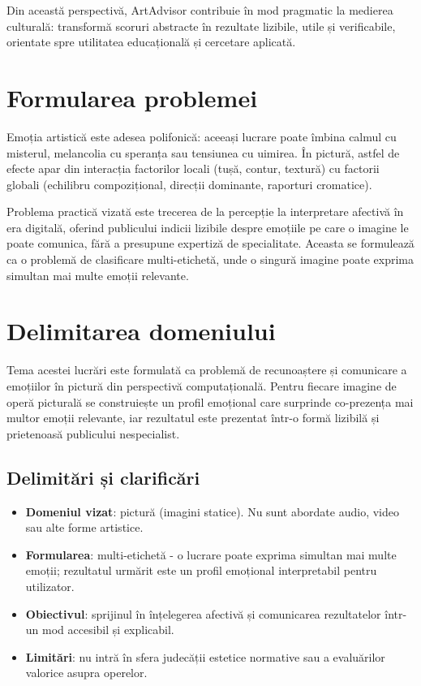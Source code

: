 Din această perspectivă, ArtAdvisor contribuie în mod pragmatic la medierea culturală: transformă scoruri abstracte în rezultate lizibile, utile și verificabile, orientate spre utilitatea educațională și cercetare aplicată.

\section{Formularea problemei}
\label{sec:intro-problema}

Emoția artistică este adesea polifonică: aceeași lucrare poate îmbina calmul cu misterul, melancolia cu speranța sau tensiunea cu uimirea. În pictură, astfel de efecte apar din interacția factorilor locali (tușă, contur, textură) cu factorii globali (echilibru compozițional, direcții dominante, raporturi cromatice).

Problema practică vizată este trecerea de la percepție la interpretare afectivă în era digitală, oferind publicului indicii lizibile despre emoțiile pe care o imagine le poate comunica, fără a presupune expertiză de specialitate. Aceasta se formulează ca o problemă de clasificare multi-etichetă, unde o singură imagine poate exprima simultan mai multe emoții relevante.

\section{Delimitarea domeniului}
\label{sec:intro-domeniu}

Tema acestei lucrări este formulată ca problemă de recunoaștere și comunicare a emoțiilor în pictură din perspectivă computațională. Pentru fiecare imagine de operă picturală se construiește un profil emoțional care surprinde co-prezența mai multor emoții relevante, iar rezultatul este prezentat într-o formă lizibilă și prietenoasă publicului nespecialist.

\subsection{Delimitări și clarificări}

\begin{itemize}
  \item \textbf{Domeniul vizat}: pictură (imagini statice). Nu sunt abordate audio, video sau alte forme artistice.
  \item \textbf{Formularea}: multi-etichetă - o lucrare poate exprima simultan mai multe emoții; rezultatul urmărit este un profil emoțional interpretabil pentru utilizator.
  \item \textbf{Obiectivul}: sprijinul în înțelegerea afectivă și comunicarea rezultatelor într-un mod accesibil și explicabil.
  \item \textbf{Limitări}: nu intră în sfera judecății estetice normative sau a evaluărilor valorice asupra operelor.
\end{itemize}

